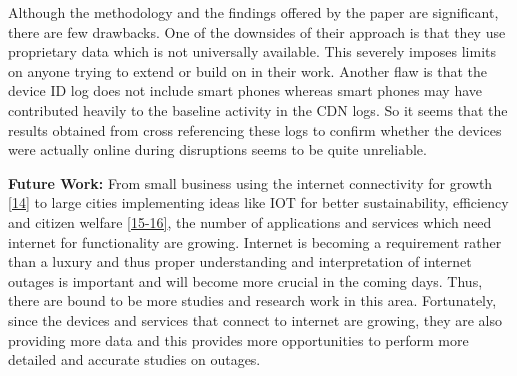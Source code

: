 \documentclass[11pt,twoside,a4paper]{article}
\begin{document}
Although the methodology and the findings offered by the paper are significant, there are few drawbacks. One of the downsides of their approach is that they use proprietary data which is not universally available. This severely imposes limits on anyone trying to extend or build on in their work. Another flaw is that the device ID log does not include smart phones whereas smart phones may have contributed heavily to the baseline activity in the CDN logs. So it seems that the results obtained from cross referencing these logs to confirm whether the devices were actually online during disruptions seems to be quite unreliable.   

\textbf{Future Work:} From small business using the internet connectivity for growth \hyperlink {K14} {[14]} to large cities implementing ideas like IOT for better sustainability, efficiency and citizen welfare \hyperlink {K15} {[15-16]}, the number of applications and services which need internet for functionality are growing. Internet is becoming a requirement rather than a luxury and thus proper understanding and interpretation of internet outages is important and will become more crucial in the coming days. Thus, there are bound to be more studies and research work in this area. Fortunately, since the devices and services that connect to internet are growing, they are also providing more data and this provides more opportunities to perform more detailed and accurate studies on outages.
\end{document}
